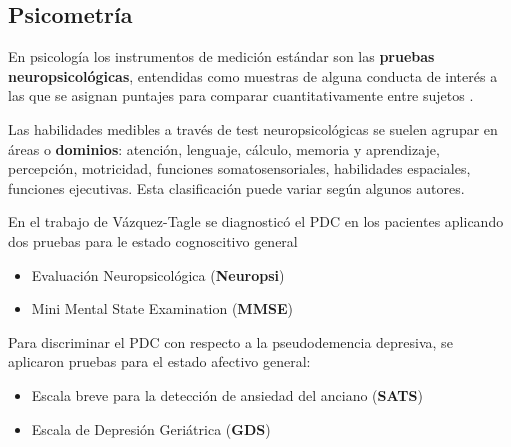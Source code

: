 
\subsection{Psicometría}

En psicología los instrumentos de medición estándar son las \textbf{pruebas neuropsicológicas}, 
entendidas como muestras de alguna conducta de interés a las que se asignan puntajes para comparar 
cuantitativamente entre sujetos \cite{Ardila12}.

Las habilidades medibles a través de test neuropsicológicas se suelen agrupar en áreas o 
\textbf{dominios}: atención, lenguaje, cálculo, memoria y aprendizaje, percepción, motricidad, 
funciones somatosensoriales, habilidades espaciales, funciones ejecutivas. Esta clasificación puede
variar según algunos autores.
%
%

En el trabajo de Vázquez-Tagle \cite{VazquezTagle16} se diagnosticó el PDC en los pacientes 
aplicando dos pruebas para le estado cognoscitivo general
%
\begin{itemize}
\item {Evaluación Neuropsicológica (\textbf{Neuropsi})} \cite{Solis03}
\item {Mini Mental State Examination (\textbf{MMSE})} \cite{Velasco15}
\end{itemize}
%

Para discriminar el PDC con respecto a la pseudodemencia depresiva, se aplicaron pruebas para el
estado afectivo general:
%
\begin{itemize}
\item {Escala breve para la detección de ansiedad del anciano (\textbf{SATS})} \cite{Vargas11}
\item {Escala de Depresión Geriátrica (\textbf{GDS})} \cite{Yesavage82,Greenberg12}
\end{itemize}

